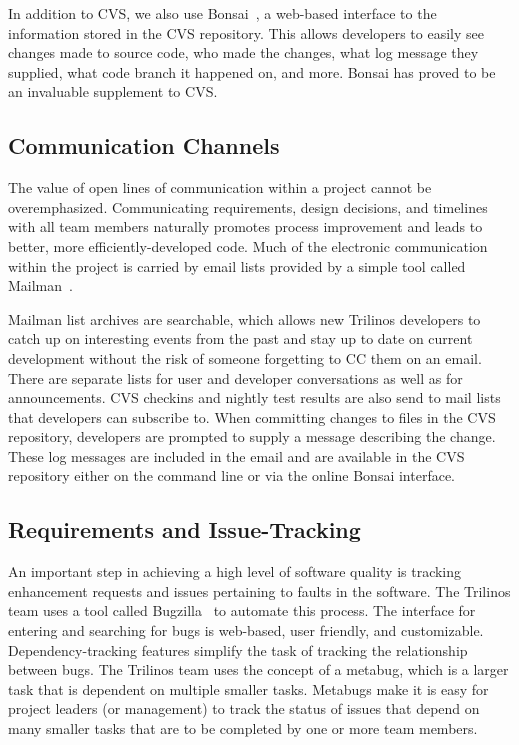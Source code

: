 \documentclass{doublecol}
\begin{document}
In addition to CVS, we also use Bonsai~\cite{Bonsai}, a web-based
interface to the information stored in the CVS repository.  This
allows developers to easily see changes made to source code, who
made the changes, what log message they supplied, what code branch
it happened on, and more.  Bonsai has proved to be an invaluable
supplement to CVS.

\subsection{Communication Channels}


The value of open lines of communication within a project cannot be
overemphasized.  Communicating requirements, design decisions, and
timelines with all team members naturally promotes process
improvement and leads to better, more efficiently-developed code.
Much of the electronic communication within the project is carried
by email lists provided by a simple tool called
Mailman~\cite{Mailman}.

Mailman list archives are  searchable, which allows new Trilinos
developers to catch up on interesting events from the past and stay
up to date on current development without the risk of someone
forgetting to CC them on an email. There are separate lists for user
and developer conversations as well as for announcements. CVS
checkins and nightly test results are also send to mail lists that
developers can subscribe to.  When committing changes to files in
the CVS repository, developers are prompted to supply a message
describing the change.  These log messages are included in the email
and are available in the CVS repository either on the command line
or via the online Bonsai interface.

\subsection{Requirements and Issue-Tracking}


An important step in achieving a high level of software quality is
tracking enhancement requests and issues pertaining to faults in the
software.  The Trilinos team uses a tool called
Bugzilla~\cite{Bugzilla} to automate this process.  The interface
for entering and searching for bugs is web-based, user friendly, and
customizable.  Dependency-tracking features simplify the task of
tracking the relationship between bugs.  The Trilinos team uses the
concept of a metabug, which is a larger task that is dependent on
multiple smaller tasks. Metabugs make it is easy for project leaders
(or management) to track the status of issues that depend on many
smaller tasks that are to be completed by one or more team members.
\end{document}
